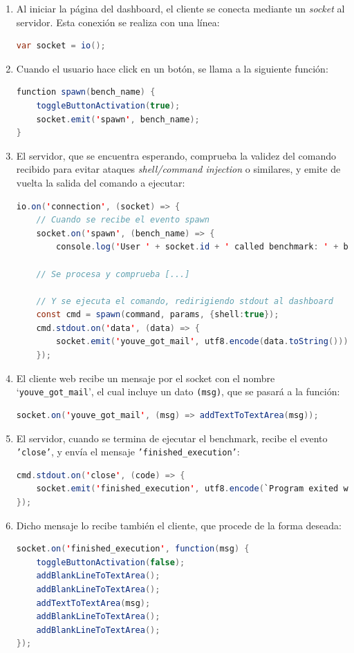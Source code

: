 \begin{enumerate}
  \item Al iniciar la página del dashboard, el cliente se conecta mediante un \textit{socket} al servidor. Esta conexión se realiza con una línea:
\begin{lstlisting}[language=java]
var socket = io();
\end{lstlisting}
  \item Cuando el usuario hace click en un botón, se llama a la siguiente función:
\begin{lstlisting}[language=java]
function spawn(bench_name) {
    toggleButtonActivation(true);
    socket.emit('spawn', bench_name);
}
\end{lstlisting}
  \item El servidor, que se encuentra esperando, comprueba la validez del comando recibido para evitar ataques \textit{shell/command injection} o similares, y emite de vuelta la salida del comando a ejecutar:
\begin{lstlisting}[language=java]
io.on('connection', (socket) => {
    // Cuando se recibe el evento spawn
    socket.on('spawn', (bench_name) => {
        console.log('User ' + socket.id + ' called benchmark: ' + bench_name);

    // Se procesa y comprueba [...]

    // Y se ejecuta el comando, redirigiendo stdout al dashboard
    const cmd = spawn(command, params, {shell:true});
    cmd.stdout.on('data', (data) => {
        socket.emit('youve_got_mail', utf8.encode(data.toString()));
    });
\end{lstlisting}
  \item El cliente web recibe un mensaje por el socket con el nombre `\texttt{youve\_got\_mail}', el cual incluye un dato \texttt{(msg)}, que se pasará a la función:
\begin{lstlisting}[language=java]
socket.on('youve_got_mail', (msg) => addTextToTextArea(msg));
\end{lstlisting}
  \item El servidor, cuando se termina de ejecutar el benchmark, recibe el evento \texttt{'close'}, y envía el mensaje \texttt{'finished\_execution'}:
\begin{lstlisting}[language=java]
cmd.stdout.on('close', (code) => {
    socket.emit('finished_execution', utf8.encode(`Program exited with code ${Number(code)}`));
});
\end{lstlisting}
  \item Dicho mensaje lo recibe también el cliente, que procede de la forma deseada:
\begin{lstlisting}[language=java]
socket.on('finished_execution', function(msg) {
    toggleButtonActivation(false);
    addBlankLineToTextArea();
    addBlankLineToTextArea();
    addTextToTextArea(msg);
    addBlankLineToTextArea();
    addBlankLineToTextArea();
});
\end{lstlisting}
\end{enumerate}

